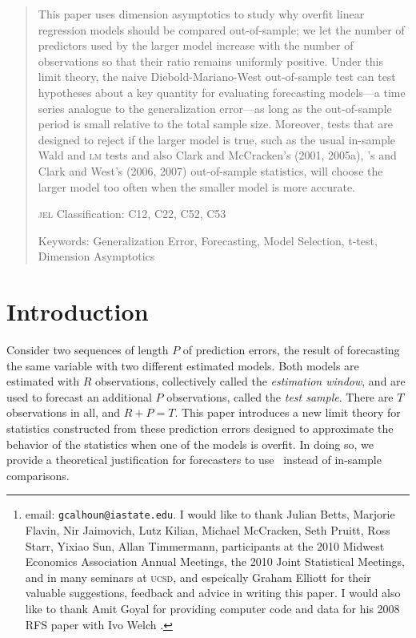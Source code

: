 \documentclass[11pt]{article}
\author{Gray Calhoun\thanks{email: \texttt{gcalhoun@iastate.edu}. I
    would like to thank Julian Betts, Marjorie Flavin, Nir Jaimovich,
    Lutz Kilian, Michael McCracken, Seth Pruitt, Ross Starr, Yixiao
    Sun, Allan Timmermann, participants at the 2010 Midwest Economics
    Association Annual Meetings, the 2010 Joint Statistical Meetings,
    and in many seminars at \textsc{ucsd}, and espeically Graham
    Elliott for their valuable suggestions, feedback and advice in
    writing this paper.  I would also like to thank Amit Goyal for
    providing computer code and data for his 2008 RFS paper with Ivo
    Welch \citep{goyal-welch-2008-rfs}.} \\ Iowa State University,
  Economics Department}
\date{October 24, 2011}
\newcommand{\citepos}[1]{\citeauthor{#1}'s \citeyearpar{#1}}
\begin{document}
\maketitle

\begin{abstract}\thispagestyle{empty}\noindent
  This paper uses dimension asymptotics to study why overfit linear
  regression models should be compared out-of-sample; we let the number of
  predictors used by the larger model increase with the number of
  observations so that their ratio remains uniformly positive.  Under
  this limit theory, the naive Diebold-Mariano-West out-of-sample test
  can test hypotheses about a key quantity for evaluating forecasting
  models---a time series analogue to the generalization error---as
  long as the out-of-sample period is small relative to the total
  sample size.  Moreover, tests that are designed to reject if the
  larger model is true, such as the usual in-sample Wald and
  \textsc{lm} tests and also Clark and McCracken's (2001, 2005a),
  \citepos{mccracken_asymptotics_2007} and Clark and West's (2006,
  2007) out-of-sample statistics, will choose the larger model too
  often when the smaller model is more accurate.

\noindent \textsc{jel} Classification: C12, C22, C52, C53

\noindent Keywords: Generalization Error, Forecasting, Model
Selection, t-test, Dimension Asymptotics
\end{abstract}

\section{Introduction}\label{sec:introduction}
Consider two sequences of length $P$ of prediction errors, the result
of forecasting the same variable with two different estimated models.
Both models are estimated with $R$ observations, collectively called
the {\em estimation window}, and are used to forecast an additional
$P$ observations, called the {\em test sample}.  There are $T$
observations in all, and $R+P=T$.  This paper introduces a new limit
theory for statistics constructed from these prediction errors
designed to approximate the behavior of the statistics when one of the
models is overfit.  In doing so, we provide a theoretical
justification for forecasters to use \oos\ instead of
in-sample comparisons.
\end{document}
